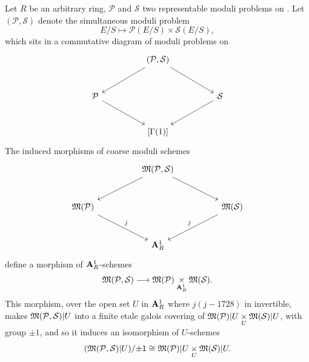 \begin{kcor}\label{cor:8.4.4}
Let $R$ be an arbitrary ring, $\mathcal{P}$ and $\mathcal{S}$ two representable moduli problems on \EllR.
Let $(\mathcal{P}, \mathcal{S})$ denote the simultaneous moduli problem
\[
E/S \mapsto \mathcal{P}(E/S) \times \mathcal{S}(E/S) ,
\]
which sits in a commutative diagram of moduli problems on \EllR
\[
\begin{tikzcd}[column sep=huge, row sep=large]
& (\mathcal{P}, \mathcal{S}) \arrow[ld] \arrow[rd] & \\
\mathcal{P} \arrow[rd] & & \mathcal{S} \arrow[ld] \\
& {[\Gamma(1)]} &
\end{tikzcd}
\]
The induced morphisms of coarse moduli schemes
\[
\begin{tikzcd}[column sep=huge, row sep=large]
& \Mfrak(\mathcal{P}, \mathcal{S}) \arrow[ld] \arrow[rd] & \\
\Mfrak(\mathcal{P}) \arrow[rd, "j"] & & \Mfrak(\mathcal{S}) \arrow[ld, "j"'] \\
& \Aff^1_R &
\end{tikzcd}
\]
define a morphism of $\mathbf{A}^1_R$-schemes
\[
\mathfrak{M}(\mathcal{P}, \mathcal{S}) \longrightarrow \mathfrak{M}(\mathcal{P}) \underset{\mathbf{A}^1_R}{\times} \mathfrak{M}(\mathcal{S}) .
\]
This morphism, over the open set $U$ in $\mathbf{A}^1_R$ where $j(j-1728)$ in invertible, makes $\mathfrak{M}(\mathcal{P}, \mathcal{S})|U$ into a finite etale galois covering of $\mathfrak{M}(\mathcal{P})|U \underset{U}{\times} \mathfrak{M}(\mathcal{S})|U$, with group $\pm 1$, and so it induces an isomorphism of $U$-schemes
\[
(\mathfrak{M}(\mathcal{P}, \mathcal{S})|U)/{\pm 1} \cong \mathfrak{M}(\mathcal{P})|U \underset{U}{\times} \mathfrak{M}(\mathcal{S})|U .
\]
\end{kcor}

